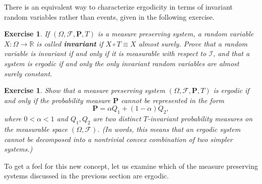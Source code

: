 \documentclass[12pt]{article}
\newtheorem{exercise}[thm]{Exercise}
\newcommand{\R}{\mathbb{R}}
\newcommand{\prob}{\mathbf{P}}
\theoremstyle{example}
\begin{document}
There is an equivalent way to characterize ergodicity in terms of invariant random variables rather than events, given in the following exercise.

\begin{exercise} If $(\Omega, \mathcal{F}, \prob, T)$ is a measure preserving system, a random variable $X:\Omega\to\R$ is called \textbf{invariant} if $X\circ T \equiv X$ almost surely. Prove that a random variable is invariant if and only if it is measurable with respect to $\mathcal{I}$, and that a system is ergodic if and only the only invariant random variables are almost surely constant.
\end{exercise}

\begin{exercise} Show that a measure preserving system $(\Omega, \mathcal{F}, \prob, T)$ is ergodic if and only if the probability measure $\prob$ \emph{cannot} be represented in the form
$$ \prob = \alpha Q_1 + (1-\alpha)Q_2, $$
where $0<\alpha<1$ and $Q_1, Q_2$ are two distinct $T$-invariant probability measures on the measurable space $(\Omega, \mathcal{F})$. (In words, this means that an ergodic system cannot be decomposed into a nontrivial convex combination of two simpler systems.)
\end{exercise}



To get a feel for this new concept, let us examine which of the measure preserving systems discussed in the previous section are ergodic.
\end{document}
